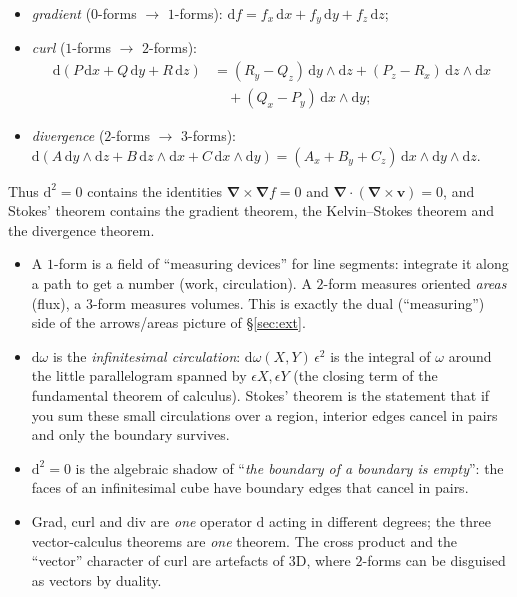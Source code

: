 \documentclass[11pt,a4paper]{article}
\numberwithin{equation}{section}
\theoremstyle{definition}
\theoremstyle{plain}
\newcommand{\R}{\mathbb{R}}
\newcommand{\dd}{\mathrm{d}}
\newcommand{\vd}{\boldsymbol{\nabla}}               %
\begin{document}
\begin{example}[$\R^3$: gradient, curl, divergence]
\begin{itemize}
  \item \emph{gradient} ($0$-forms $\to$ $1$-forms):
  $\dd f=f_x\,\dd x+f_y\,\dd y+f_z\,\dd z$;
  \item \emph{curl} ($1$-forms $\to$ $2$-forms):
  \begin{align*}
   \dd(P\,\dd x+Q\,\dd y+R\,\dd z)&=(R_y-Q_z)\,\dd y\wedge\dd z+(P_z-R_x)\,\dd z\wedge\dd x\\
   &\quad+(Q_x-P_y)\,\dd x\wedge\dd y;
  \end{align*}
  \item \emph{divergence} ($2$-forms $\to$ $3$-forms):
  $\dd(A\,\dd y\wedge\dd z+B\,\dd z\wedge\dd x+C\,\dd x\wedge\dd y)=(A_x+B_y+C_z)\,\dd x\wedge\dd y\wedge\dd z$.
\end{itemize}

Thus $\dd^2=0$ contains the identities $\vd\times\vd f=0$ and $\vd\cdot(\vd\times\mathbf v)=0$, and Stokes' theorem contains the gradient theorem, the Kelvin--Stokes theorem and the divergence theorem.
\end{example}

\begin{intuition}
\begin{itemize}
  \item A $1$-form is a field of ``measuring devices'' for line segments: integrate it along a path to get a number (work, circulation). A $2$-form measures oriented \emph{areas} (flux), a $3$-form measures volumes. This is exactly the dual (``measuring'') side of the arrows/areas picture of \S\ref{sec:ext}.
  \item $\dd\omega$ is the \emph{infinitesimal circulation}: $\dd\omega(X,Y)\,\epsilon^2$ is the integral of $\omega$ around the little parallelogram spanned by $\epsilon X,\epsilon Y$ (the closing term of the fundamental theorem of calculus). Stokes' theorem is the statement that if you sum these small circulations over a region, interior edges cancel in pairs and only the boundary survives.
  \item $\dd^2=0$ is the algebraic shadow of ``\emph{the boundary of a boundary is empty}'': the faces of an infinitesimal cube have boundary edges that cancel in pairs.
  \item Grad, curl and div are \emph{one} operator $\dd$ acting in different degrees; the three vector-calculus theorems are \emph{one} theorem. The cross product and the ``vector'' character of curl are artefacts of $3$D, where $2$-forms can be disguised as vectors by duality.
\end{itemize}
\end{intuition}
\end{document}
